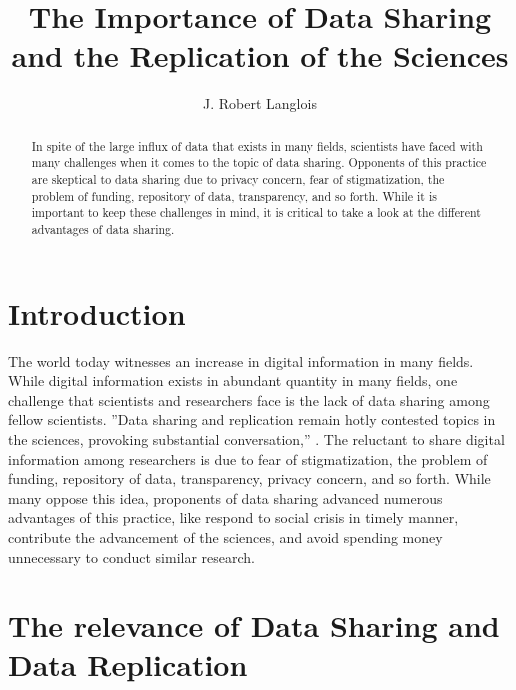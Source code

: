 \documentclass[sigconf]{acmart}
\begin{document}
\title{The Importance of Data Sharing and the Replication of the Sciences}




\author{J. Robert Langlois}




\begin{abstract}


In spite of the large influx of data that exists in many fields, scientists have faced with many challenges when it comes to the topic of data sharing. Opponents of this practice are skeptical to data sharing due to privacy concern, fear of stigmatization, the problem of funding, repository of data, transparency, and so forth. While it is important to keep these challenges in mind, it is critical to take a look at the different advantages of data sharing. 

\end{abstract}



\maketitle

\section{Introduction}

The world today witnesses an increase in digital information in many fields. While digital information exists in abundant quantity in many fields, one challenge that scientists and researchers face is the lack of data sharing among fellow scientists. ''Data sharing and replication remain hotly contested topics in the sciences, provoking substantial conversation,'' \cite{leetaru2016}. The reluctant to share digital information among researchers is due to fear of stigmatization, the problem of funding, repository of data, transparency, privacy concern, and so forth. While many oppose this idea, proponents of data sharing advanced numerous advantages of this practice, like respond to social crisis in timely manner, contribute the advancement of the sciences, and avoid spending money unnecessary to conduct similar research. 


\section{The relevance of Data Sharing and Data Replication 
}
\end{document}
